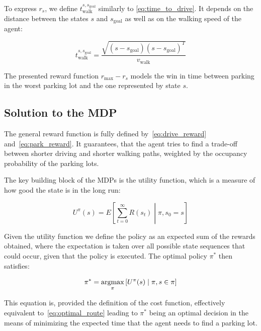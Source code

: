To express $r_s$, we define $t_{\mathrm{walk}}^{s,s_{\mathrm{goal}}}$
similarly to \eqref{eq:time_to_drive}. It depends on the distance between the
states $s$ and $s_\mathrm{goal}$ as well as on the walking speed of the agent:

\begin{equation}
t_{\mathrm{walk}}^{s,s_{\mathrm{goal}}} = \frac{\sqrt{(s -
s_{\mathrm{goal}}) {(s - s_{\mathrm{goal}})}^T}}{v_{\mathrm{walk}}}
\end{equation}

The presented reward function $r_{\max} - r_s$ models the win in time between
parking in the worst parking lot and the one represented by state $s$.

\subsection{Solution to the MDP} %
\label{sub:solution_to_the_mdp}

The general reward function is fully defined by~\eqref{eq:drive_reward}
and~\eqref{eq:park_reward}. It guarantees, that the agent tries to find a
trade-off between shorter driving and shorter walking paths, weighted by the
occupancy probability of the parking lots.

The key building block of the MDPs is the utility function, which is a measure
of how good the state is in the long run:

\begin{equation}
\label{eq:non_discount_utility}
U^{\pi}(s) = E\left[\sum_{t=0}^{\infty} R(s_t) \mathrel{}\middle|\mathrel{} \pi,s_0 = s \right]
\end{equation}

Given the utility function we define the policy as an expected sum of the
rewards obtained, where the expectation is taken over all possible state
sequences that could occur, given that the policy is executed. The optimal
policy $\pi^*$ then satisfies:

\begin{equation}
\label{eq:optimal_policy}
\pi^* = \mathop{\rm argmax}_\pi \left[ U^{\pi}(s) \mid \pi, s \in \pi \right]
\end{equation}

This equation is, provided the definition of the cost function, effectively
equivalent to~\eqref{eq:optimal_route} leading to $\pi^*$ being an optimal
decision in the means of minimizing the expected time that the agent needs to
find a parking lot.

